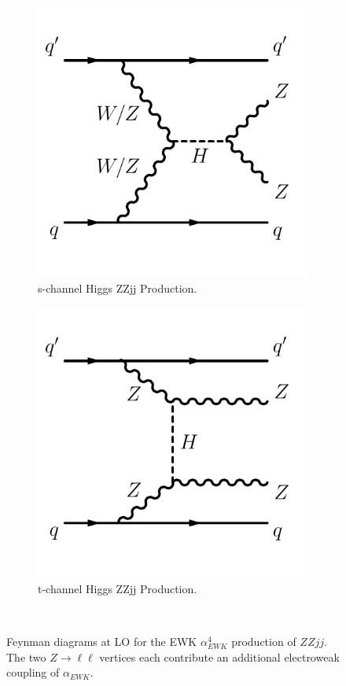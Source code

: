 \begin{figure}[ht]
\begin{subfigure}{.48\textwidth}
  \label{fig:ZZjjFeynmanDiag_EWk_b}
\end{subfigure}
\begin{subfigure}{.48\textwidth}
  \centering
  \includegraphics[width=.8\linewidth]{figures/Theory/diagramEWZZjjSchnHiggs.pdf}  
  \caption{s-channel Higgs ZZjj Production.}
  \label{fig:ZZjjFeynmanDiag_EWk_c}
\end{subfigure}
\begin{subfigure}{.48\textwidth}
  \centering
  \includegraphics[width=.8\linewidth]{figures/Theory/diagramEWZZjjTchnHiggs.pdf}  
  \caption{t-channel Higgs ZZjj Production.}
  \label{fig:ZZjjFeynmanDiag_EWk_d}
\end{subfigure}\\
\caption{Feynman diagrams at LO for the EWK $\alpha_{EWK}^4$ production of $ZZjj$. The two $Z\rightarrow \ell \ell$ vertices each contribute an additional electroweak coupling of $\alpha_{EWK}$. }
\label{fig:ZZjjFeynmanDiag_EWk}
\end{figure}

